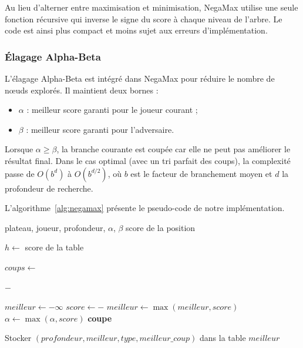 \documentclass[12pt, a4paper]{article}
\begin{document}
Au lieu d'alterner entre maximisation et minimisation, NegaMax utilise une seule fonction récursive qui inverse le signe du score à chaque niveau de l'arbre. Le code est ainsi plus compact et moins sujet aux erreurs d'implémentation.

\subsubsection{Élagage Alpha-Beta}

L'élagage Alpha-Beta est intégré dans NegaMax pour réduire le nombre de nœuds explorés. Il maintient deux bornes :

\begin{itemize}
    \item $\alpha$ : meilleur score garanti pour le joueur courant ;
    \item $\beta$ : meilleur score garanti pour l'adversaire.
\end{itemize}

Lorsque $\alpha \geq \beta$, la branche courante est coupée car elle ne peut pas améliorer le résultat final. Dans le cas optimal (avec un tri parfait des coups), la complexité passe de $O(b^d)$ à $O(b^{d/2})$, où $b$ est le facteur de branchement moyen et $d$ la profondeur de recherche.

L'algorithme~\ref{alg:negamax} présente le pseudo-code de notre implémentation.

\begin{algorithm}[H]
\caption{NegaMax avec élagage Alpha-Beta}
\label{alg:negamax}
\begin{algorithmic}[1]
\Require plateau, joueur, profondeur, $\alpha$, $\beta$
\Ensure score de la position

    \State {}
\EndIf

\State $h \gets$ 
    \State \Return score de la table
\EndIf

    \State \Return {}
\EndIf

\State $coups \gets$ 

        \State \Return {}
    \Else
        \State \Return $-$
    \EndIf
\EndIf

\State $meilleur \gets -\infty$
    \State {}
    \State $score \gets -$
    \State {}
    \State $meilleur \gets \max(meilleur, score)$
    \State $\alpha \gets \max(\alpha, score)$
    \If{$\alpha \geq \beta$}
        \State \textbf{coupe} 
    \EndIf
\EndFor

\State Stocker $(profondeur, meilleur, type, meilleur\_coup)$ dans la table
\State \Return $meilleur$
\end{algorithmic}
\end{algorithm}
\end{document}
